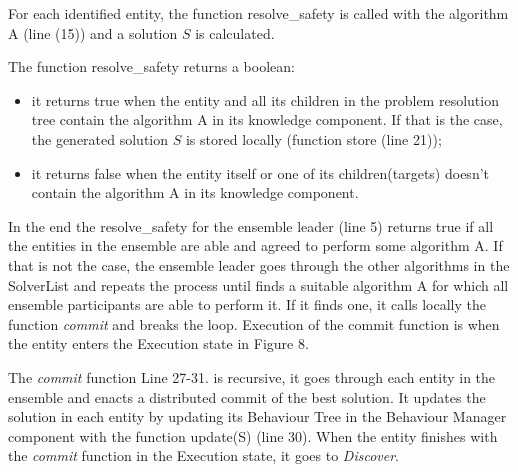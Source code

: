 \documentclass[journal]{IEEEtran}
\theoremstyle{definition}
\begin{document}
For each identified entity, the function resolve\_safety is called with the algorithm A (line (15)) 
and a solution $S$ is calculated. 

The function resolve\_safety returns a boolean: 
\begin{itemize}
\item it returns true when the entity and all its children in the problem resolution tree contain the algorithm A in its knowledge component.  If that is the case, the generated solution $S$ is stored locally (function store (line 21));
\item it returns false when the entity itself or one of its children(targets) doesn't contain the algorithm A in its knowledge component.
\end{itemize}

In the end the resolve\_safety for the ensemble leader (line 5) returns true if all the entities in the ensemble are able and agreed to perform some algorithm A. If that is not the case, the ensemble leader goes through the other algorithms in the SolverList and repeats the process until finds a suitable algorithm A for which all ensemble participants are able to perform it. If it finds one, it calls locally the function \textit{commit} and breaks the loop. Execution of the commit function is when the entity enters the Execution state in Figure 8.

The \textit{commit} function 
{Line 27-31.} is recursive, it goes through each entity in the ensemble and enacts a distributed commit of the best solution. It updates the solution in each entity by updating its Behaviour Tree in the Behaviour Manager component with the function update(S) (line 30).
When the entity finishes with the \textit{commit} function in the Execution state, it goes to \textit{Discover}.


\end{document}
